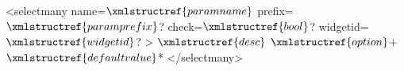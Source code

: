 <selectmany name=$\xmlstructref{paramname}$ prefix=$\xmlstructref{paramprefix}$? check=$\xmlstructref{bool}$? widgetid=$\xmlstructref{widgetid}$? >
  $\xmlstructref{desc}$
  $\xmlstructref{option}$+
  $\xmlstructref{defaultvalue}$*
</selectmany>
